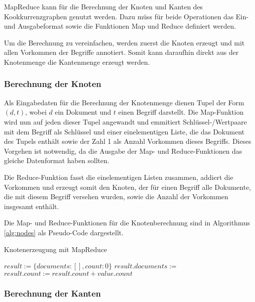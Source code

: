 MapReduce kann für die Berechnung der Knoten und Kanten des Kookkurrenzgraphen genutzt werden. Dazu müss für beide Operationen das Ein- und Ausgabeformat sowie die Funktionen Map und Reduce definiert werden.

Um die Berechnung zu vereinfachen, werden zuerst die Knoten erzeugt und mit allen Vorkommen der Begriffe annotiert. Somit kann daraufhin direkt aus der Knotenmenge die Kantenmenge erzeugt werden.

\subsubsection{Berechnung der Knoten}

Als Eingabedaten für die Berechnung der Knotenmenge dienen Tupel der Form \((d, t)\), wobei \(d\) ein Dokument und \(t\) einen Begriff darstellt. Die Map-Funktion wird nun auf jeden dieser Tupel angewandt und emmitiert Schlüssel-/Wertpaare mit dem Begriff als Schlüssel und einer einelementigen Liste, die das Dokument des Tupels enthält sowie der Zahl \num{1} als Anzahl Vorkommen dieses Begriffs. Dieses Vorgehen ist notwendig, da die Ausgabe der Map- und Reduce-Funktionen das gleiche Datenformat haben sollten.

Die Reduce-Funktion fasst die einelementigen Listen zusammen, addiert die Vorkommen und erzeugt somit den Knoten, der für einen Begriff alle Dokumente, die mit diesem Begriff versehen wurden, sowie die Anzahl der Vorkommen insgesamt enthält.

Die Map- und Reduce-Funktionen für die Knotenberechnung sind in Algorithmus \ref{alg:nodes} als Pseudo-Code dargestellt.

\begin{algorithm}
\caption{Knotenerzeugung mit MapReduce
    \label{alg:nodes}}
    \begin{algorithmic}[1]
            \State {}
        \EndFunction
        \Statex
            \State $result := \{documents: [], count: 0\}$
                \State $result.documents :=$ 
                \State $result.count := result.count + value.count$
            \EndFor
            \State {}
        \EndFunction
    \end{algorithmic}
\end{algorithm}

\subsubsection{Berechnung der Kanten}

